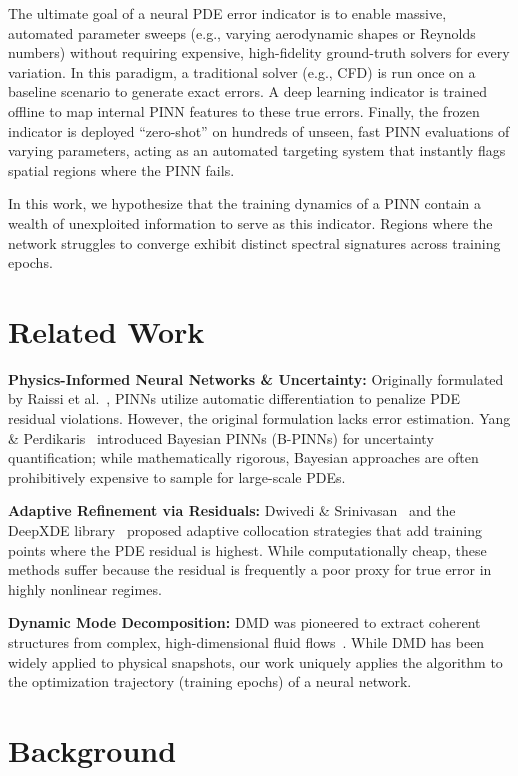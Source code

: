 \documentclass{article}
\begin{document}
The ultimate goal of a neural PDE error indicator is to enable massive, automated parameter sweeps (e.g., varying aerodynamic shapes or Reynolds numbers) without requiring expensive, high-fidelity ground-truth solvers for every variation. In this paradigm, a traditional solver (e.g., CFD) is run once on a baseline scenario to generate exact errors. A deep learning indicator is trained offline to map internal PINN features to these true errors. Finally, the frozen indicator is deployed ``zero-shot'' on hundreds of unseen, fast PINN evaluations of varying parameters, acting as an automated targeting system that instantly flags spatial regions where the PINN fails.

In this work, we hypothesize that the training dynamics of a PINN contain a wealth of unexploited information to serve as this indicator. Regions where the network struggles to converge exhibit distinct spectral signatures across training epochs.


\section{Related Work}
\textbf{Physics-Informed Neural Networks \& Uncertainty:} Originally formulated by Raissi et al.~\cite{raissi2019physics}, PINNs utilize automatic differentiation to penalize PDE residual violations. However, the original formulation lacks error estimation. Yang \& Perdikaris~\cite{yang2021bpinns} introduced Bayesian PINNs (B-PINNs) for uncertainty quantification; while mathematically rigorous, Bayesian approaches are often prohibitively expensive to sample for large-scale PDEs. 

\textbf{Adaptive Refinement via Residuals:} Dwivedi \& Srinivasan~\cite{dwivedi2020physics} and the DeepXDE library~\cite{lu2021deepxde} proposed adaptive collocation strategies that add training points where the PDE residual is highest. While computationally cheap, these methods suffer because the residual is frequently a poor proxy for true error in highly nonlinear regimes.

\textbf{Dynamic Mode Decomposition:} DMD was pioneered to extract coherent structures from complex, high-dimensional fluid flows~\cite{schmid2010dynamic, kutz2016dynamic}. While DMD has been widely applied to physical snapshots, our work uniquely applies the algorithm to the optimization trajectory (training epochs) of a neural network.


\section{Background}
\end{document}
